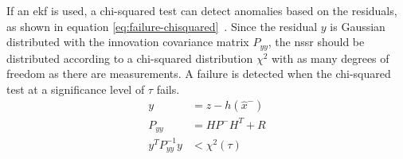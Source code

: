 If an \gls{ekf} is used, a chi-squared test can detect anomalies based on the residuals, as shown in equation \ref{eq:failure-chisquared}~\cites[p.~4292]{Hausman.2016}[p.~2050~f.]{Valls.2018}. Since the residual $y$ is Gaussian distributed with the innovation covariance matrix $P_{yy}$, the \gls{nssr} should be distributed according to a chi-squared distribution $\chi^2$ with as many degrees of freedom as there are measurements. A failure is detected when the chi-squared test at a significance level of $\tau$ fails.
\begin{subequations}\label{eq:failure-chisquared}
\begin{alignat}{2}%
y &= z - h(\hat{x}^-) \\%
P_{yy} &= H P^- H^T + R \\%
y^T P_{yy}^{-1} y &< \chi^2(\tau)%
\end{alignat}
\end{subequations}


